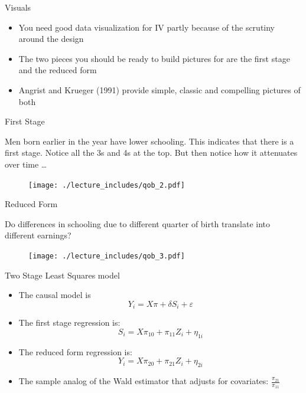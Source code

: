\documentclass{beamer}
\begin{document}
\begin{frame}{Visuals}

\begin{itemize}
\item You need good data visualization for IV partly because of the scrutiny around the design
\item The two pieces you should be ready to build pictures for are the first stage and the reduced form
\item Angrist and Krueger (1991) provide simple, classic and compelling pictures of both
\end{itemize}

\end{frame}



\begin{frame}{First Stage}
	
	 Men born earlier in the year have lower schooling. This indicates that there is a first stage. Notice all the 3s and 4s at the top. But then notice how it attenuates over time \dots
	
	\begin{figure}
	\texttt{[image: ./lecture\_includes/qob\_2.pdf]}
	\end{figure}
	
\end{frame}


\begin{frame}{Reduced Form}
	
	 Do differences in schooling due to different quarter of birth translate into different earnings?
	
	\begin{figure}
	\texttt{[image: ./lecture\_includes/qob\_3.pdf]}
	\end{figure}
	
\end{frame}

\begin{frame}{Two Stage Least Squares model}
	
	\begin{itemize}
	\item The causal model is $$Y_i = X \pi + \delta S_i + \varepsilon$$
	\item The first stage regression is:$$S_i=X\pi_{10} + \pi_{11}Z_i + \eta_{1i}$$
	\item The reduced form regression is:$$Y_i=X\pi_{20} + \pi_{21}Z_i+\eta_{2i}$$
	\item The sample analog of the Wald estimator that adjusts for covariates: $\frac{\pi_{21}}{\pi_{11}}$
	\end{itemize}

\end{frame}
\end{document}
